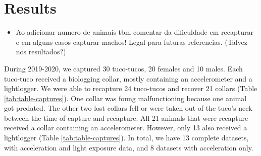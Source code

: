 \documentclass[english,msc,numbers,hidelinks]{coppe}
\providecommand{\tightlist}{%
  \setlength{\itemsep}{0pt}\setlength{\parskip}{0pt}}
\begin{document}
  \hypertarget{results}{%
  \section{Results}\label{results}}
  \begin{itemize}
  \tightlist
  \item
    Ao adicionar numero de animais tbm comentar da dificuldade em recapturar e em alguns casos capturar machos! Legal para futuras referencias. (Talvez nos resultados?)
  \end{itemize}
  During 2019-2020, we captured 30 tuco-tucos, 20 females and 10 males. Each tuco-tuco received a biologging collar, mostly containing an accelerometer and a lightlogger. We were able to recapture 24 tuco-tucos and recover 21 collars (Table \ref{tab:table-captures}). One collar was foung malfunctioning because one animal got predated. The other two lost collars fell or were taken out of the tuco's neck between the time of capture and recapture. All 21 animals that were recapture received a collar containing an accelerometer. However, only 13 also received a lightlogger (Table \ref{tab:table-captures}). In total, we have 13 complete datasets, with acceleration and light exposure data, and 8 datasets with acceleration only.
\end{document}
